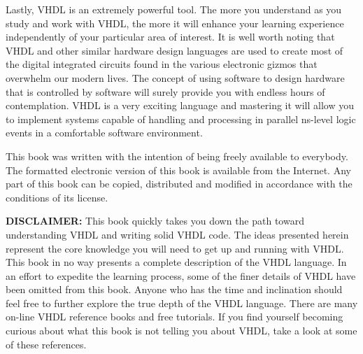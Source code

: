 Lastly, VHDL is an extremely powerful tool. The more you understand as you study and work with VHDL, the more it will enhance your learning experience independently of your particular area of interest. It is well worth noting that VHDL and other similar hardware design languages are used to create most of the digital integrated circuits found in the various electronic gizmos that overwhelm our modern lives. The concept of using software to design hardware that is controlled by software will surely provide you with endless hours of contemplation. VHDL is a very exciting language and mastering it will allow you to implement systems capable of handling and processing in parallel ns-level logic events in a comfortable software environment.

This book was written with the intention of being freely available to everybody. The formatted electronic version of this book is available from the Internet. Any part of this book can be copied, distributed and modified in accordance with the conditions of its license.
\vspace{10pt}

\noindent
\textbf{DISCLAIMER:}
This book quickly takes you down the path toward understanding VHDL and writing solid VHDL code. The ideas presented herein represent the core knowledge you will need to get up and running with VHDL. This book in no way presents a complete description of the VHDL language. In an effort to expedite the learning process, some of the finer details of VHDL have been omitted from this book. Anyone who has the time and inclination should feel free to further explore the true depth of the VHDL language. There are many on-line VHDL reference books and free tutorials. If you find yourself becoming curious about what this book is not telling you about VHDL, take a look at some of these references.

